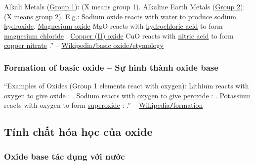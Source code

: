 \documentclass{article}
\begin{document}
Alkali Metals (\href{https://en.wikipedia.org/wiki/Alkali_metal}{Group 1}):  (X means group 1). Alkaline Earth Metals (\href{https://en.wikipedia.org/wiki/Alkaline_earth_metal}{Group 2}):  (X means group 2). E.g.: \href{https://en.wikipedia.org/wiki/Sodium_oxide}{Sodium oxide}  reacts with water to produce \href{https://en.wikipedia.org/wiki/Sodium_hydroxide}{sodium hydroxide}. \href{https://en.wikipedia.org/wiki/Magnesium_oxide}{Magnesium oxide} MgO reacts with \href{https://en.wikipedia.org/wiki/Hydrochloric_acid}{hydrochloric acid} to form \href{https://en.wikipedia.org/wiki/Magnesium_chloride}{magnesium chloride} . \href{https://en.wikipedia.org/wiki/Copper(II)_oxide}{Copper (II) oxide} CuO reacts with \href{https://en.wikipedia.org/wiki/Nitric_acid}{nitric acid}  to form \href{https://en.wikipedia.org/wiki/Copper_nitrate}{copper nitrate} .'' -- \href{https://en.wikipedia.org/wiki/Basic_oxide#Etymology}{Wikipedia{\tt/}basic oxide{\tt/}etymology}

\subsubsection{Formation of basic oxide -- Sự hình thành oxide base}
``Examples of Oxides (Group 1 elements react with oxygen): Lithium reacts with oxygen to give oxide : . Sodium reacts with oxygen to give \href{https://en.wikipedia.org/wiki/Peroxide}{peroxide} : . Potassium reacts with oxygen to form \href{https://en.wikipedia.org/wiki/Superoxide}{superoxide} : .'' -- \href{https://en.wikipedia.org/wiki/Basic_oxide#Formation}{Wikipedia{\tt/}formation}

\subsection{Tính chất hóa học của oxide}

\subsubsection{Oxide base tác dụng với nước}
\end{document}
